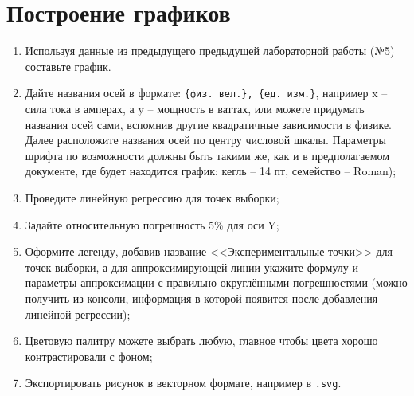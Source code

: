 \documentclass[14pt,a4paper]{article}
\begin{document}
\section{Построение графиков}
\begin{enumerate}
    \item Используя данные из предыдущего предыдущей лабораторной работы (№5) составьте график. 
    \item Дайте названия осей в формате: \verb|{физ. вел.}, {ед. изм.}|, например x -- сила тока в амперах, а y -- мощность в ваттах, или можете придумать названия осей сами, вспомнив другие квадратичные зависимости в физике. Далее расположите названия осей по центру числовой шкалы. Параметры шрифта по возможности должны быть такими же, как и в предполагаемом документе, где будет находится график: кегль -- 14 пт, семейство -- Roman);
    \item Проведите линейную регрессию для точек выборки;
    \item Задайте относительную погрешность 5\% для оси Y;
    \item Оформите легенду, добавив название <<Экспериментальные точки>> для точек выборки, а для аппроксимирующей линии укажите формулу и параметры аппроксимации с правильно округлёнными погрешностями (можно получить из консоли, информация в которой появится после добавления линейной регрессии);
    \item Цветовую палитру можете выбрать любую, главное чтобы цвета хорошо контрастировали с фоном;
    \item Экспортировать рисунок в векторном формате, например в \verb|.svg|.
\end{enumerate}

% 
\end{document}
